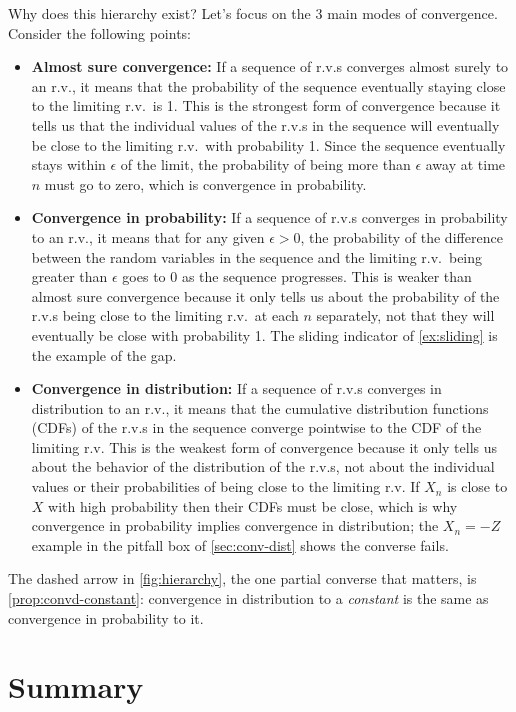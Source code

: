Why does this hierarchy exist? Let's focus on the 3 main modes of convergence.
Consider the following points:
\begin{itemize}
\item \textbf{Almost sure convergence:} If a sequence of r.v.s converges almost surely to an r.v., it means that the probability of the sequence eventually staying close to the limiting r.v.\ is 1.
This is the strongest form of convergence because it tells us that the individual values of the r.v.s in the sequence will eventually be close to the limiting r.v.\ with probability 1.
Since the sequence eventually stays within $\epsilon$ of the limit, the probability of being more than $\epsilon$ away at time $n$ must go to zero, which is convergence in probability.

\item \textbf{Convergence in probability:} If a sequence of r.v.s converges in probability to an r.v., it means that for any given $\epsilon > 0$, the probability of the difference between the random variables in the sequence and the limiting r.v.\ being greater than $\epsilon$ goes to 0 as the sequence progresses.
This is weaker than almost sure convergence because it only tells us about the probability of the r.v.s being close to the limiting r.v.\ at each $n$ separately, not that they will eventually be close with probability 1.
The sliding indicator of \cref{ex:sliding} is the example of the gap.

\item \textbf{Convergence in distribution:} If a sequence of r.v.s converges in distribution to an r.v., it means that the cumulative distribution functions (CDFs) of the r.v.s in the sequence converge pointwise to the CDF of the limiting r.v.
This is the weakest form of convergence because it only tells us about the behavior of the distribution of the r.v.s, not about the individual values or their probabilities of being close to the limiting r.v.
If $X_n$ is close to $X$ with high probability then their CDFs must be close, which is why convergence in probability implies convergence in distribution; the $X_n = -Z$ example in the pitfall box of \cref{sec:conv-dist} shows the converse fails.
\end{itemize}


The dashed arrow in \cref{fig:hierarchy}, the one partial converse that matters, is \cref{prop:convd-constant}: convergence in distribution to a \textit{constant} is the same as convergence in probability to it.


\section{Summary}
\label{sec:modes-summary}

